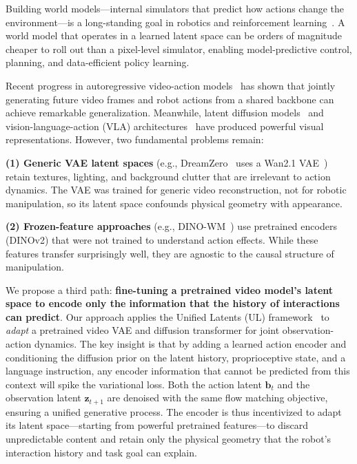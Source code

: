 \documentclass{article}
\newcommand{\vz}{\bm{z}}
\newcommand{\vb}{\bm{b}}
\begin{document}
Building world models---internal simulators that predict how actions change the environment---is a long-standing goal in robotics and reinforcement learning~\citep{ha2018world,hafner2023dreamerv3}.
A world model that operates in a learned latent space can be orders of magnitude cheaper to roll out than a pixel-level simulator, enabling model-predictive control, planning, and data-efficient policy learning.

Recent progress in autoregressive video-action models~\citep{dreamzero2025} has shown that jointly generating future video frames and robot actions from a shared backbone can achieve remarkable generalization.
Meanwhile, latent diffusion models~\citep{rombach2022high} and vision-language-action (VLA) architectures~\citep{brohan2023rt2,kim2024openvla} have produced powerful visual representations.
However, two fundamental problems remain:

\textbf{(1) Generic VAE latent spaces} (e.g., DreamZero~\citep{dreamzero2025} uses a Wan2.1 VAE~\citep{wan2025}) retain textures, lighting, and background clutter that are irrelevant to action dynamics.
The VAE was trained for generic video reconstruction, not for robotic manipulation, so its latent space confounds physical geometry with appearance.

\textbf{(2) Frozen-feature approaches} (e.g., DINO-WM~\citep{zhou2024dinowm}) use pretrained encoders (DINOv2) that were not trained to understand action effects.
While these features transfer surprisingly well, they are agnostic to the causal structure of manipulation.

We propose a third path: \textbf{fine-tuning a pretrained video model's latent space to encode only the information that the history of interactions can predict}.
Our approach applies the Unified Latents (UL) framework~\citep{heek2025ul} to \emph{adapt} a pretrained video VAE and diffusion transformer for joint observation-action dynamics.
The key insight is that by adding a learned action encoder and conditioning the diffusion prior on the latent history, proprioceptive state, and a language instruction, any encoder information that cannot be predicted from this context will spike the variational loss.
Both the action latent $\vb_t$ and the observation latent $\vz_{t+1}$ are denoised with the same flow matching objective, ensuring a unified generative process.
The encoder is thus incentivized to adapt its latent space---starting from powerful pretrained features---to discard unpredictable content and retain only the physical geometry that the robot's interaction history and task goal can explain.
\end{document}
